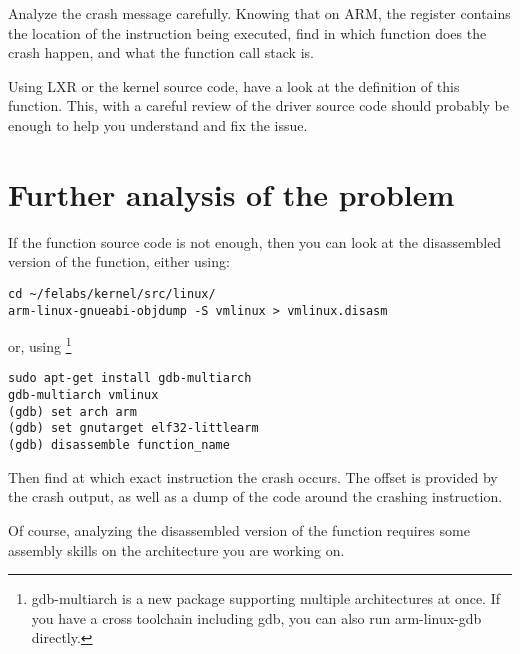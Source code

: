 Analyze the crash message carefully. Knowing that on ARM, the 
register contains the location of the instruction being executed, find
in which function does the crash happen, and what the function call
stack is.

Using LXR or the kernel source code, have a look at the definition of this
function. This, with a careful review of the driver source code should
probably be enough to help you understand and fix the issue.

\section{Further analysis of the problem}

If the function source code is not enough, then you can look at the
disassembled version of the function, either using:

\begin{verbatim}
cd ~/felabs/kernel/src/linux/
arm-linux-gnueabi-objdump -S vmlinux > vmlinux.disasm
\end{verbatim}

or, using \footnote{gdb-multiarch is a new package
supporting multiple architectures at once. If you have a cross
toolchain including gdb, you can also run arm-linux-gdb directly.}

\begin{verbatim}
sudo apt-get install gdb-multiarch
gdb-multiarch vmlinux
(gdb) set arch arm
(gdb) set gnutarget elf32-littlearm
(gdb) disassemble function_name
\end{verbatim}

Then find at which exact instruction the crash occurs. The offset is
provided by the crash output, as well as a dump of the code around the
crashing instruction.

Of course, analyzing the disassembled version of the function requires
some assembly skills on the architecture you are working on.
